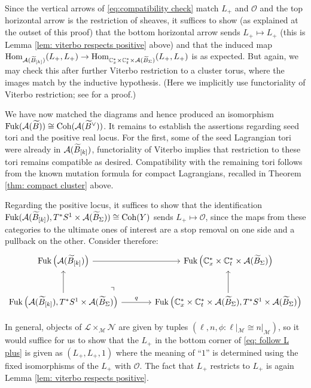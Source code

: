 \documentclass[12pt, letter]{amsart}
\DeclareMathOperator{\Fuk}{Fuk}
\theoremstyle{definition}
\begin{document}
Since the vertical arrows of \eqref{eq:compatibility check} match $L_+$ and $\mathcal{O}$ and the top horizontal arrow is the restriction of sheaves, it suffices to show (as explained at the outset of this proof) that the bottom horizontal arrow sends $L_+ \mapsto L_+$ (this is Lemma \ref{lem: viterbo respects positive} above) and that the induced map $\operatorname{Hom}_{\mathcal{A}( \widetilde B_{[k]})}(L_+, L_+) \to \operatorname{Hom}_{\mathbb{C}_x^* \times  \mathbb{C}^*_t \times \mathcal{A}(\widetilde B_\Sigma )}(L_+, L_+)$ is as expected.  But again, we may check this after further Viterbo restriction to a cluster torus, where the images match by the inductive hypothesis.  (Here we implicitly use functoriality of Viterbo restriction; see \cite[Sec. 2]{HS26} for a proof.) 

We have now matched the diagrams and hence produced an isomorphism 
$\Fuk(\cA( \widetilde B)) \cong \Coh(\cA( \widetilde B^\vee))$. It remains to establish the assertions regarding seed tori and the positive real locus.  For the first, some of the seed Lagrangian tori were already in $\mathcal{A}( \widetilde B_{[k]})$, functoriality of Viterbo implies that restriction to these tori remains compatible as desired.  Compatibility with the remaining tori follows from the known mutation formula for compact Lagrangians, recalled in Theorem \ref{thm: compact cluster} above. 

Regarding the positive locus, it suffices to show that the identification $\Fuk( \cA( \widetilde B_{[k]}), T^*S^1 \times \cA(\widetilde B_\Sigma)) \cong \Coh(Y)$ sends $L_+ \mapsto \mathcal{O}$, since the maps from these categories to the ultimate ones of interest are a stop removal on one side and a pullback on the other. Consider therefore: 
\begin{equation} \label{eq: follow L plus}
    \begin{tikzcd}[column sep=large,row sep=large]
\Fuk\left(\cA( \widetilde B_{[k]})\right)\arrow[r]
&\Fuk\left(  \bC_x^* \times  \bC^*_t \times \cA(\widetilde B_\Sigma )  \right)\\
\Fuk\left( \cA( \widetilde B_{[k]}), T^*S^1 \times \cA(\widetilde B_\Sigma) \right) \arrow[u]  
\arrow[ur, phantom, "\urcorner", very near start]
\arrow[r,"q"]
&\Fuk \left(\bC_x^* \times  \bC^*_t \times \cA(\widetilde B_\Sigma ) , T^*S^1 \times \cA(\widetilde B_\Sigma) \right) \arrow[u]
\end{tikzcd}
\end{equation}

In general, objects of $\mathcal{L} \times_{\mathcal{M}} \mathcal{N}$ are given by tuples
$(\ell, n, \phi: \ell|_{\mathcal{M}} \cong n|_{\mathcal{M}})$, so it would suffice for us to show that the $L_+$ in the bottom corner of \eqref{eq: follow L plus} is given as $(L_+, L_+, 1)$ where the meaning of ``$1$'' is determined using the fixed isomorphisms of the $L_+$ with $\mathcal{O}$.  The fact that $L_+$ restricts to $L_+$ is again Lemma \ref{lem: viterbo respects positive}.  
\end{document}
